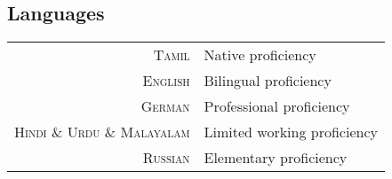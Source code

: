 \subsection{Languages}
\begin{longtable}
	{r|p{13cm}}
	\textsc{Tamil} & Native proficiency\\
	\textsc{English} & Bilingual proficiency\\
	\textsc{German} & Professional proficiency\\
	\textsc{Hindi \& Urdu \& Malayalam} & Limited working proficiency\\
	\textsc{Russian} & Elementary proficiency\\
\end{longtable}
